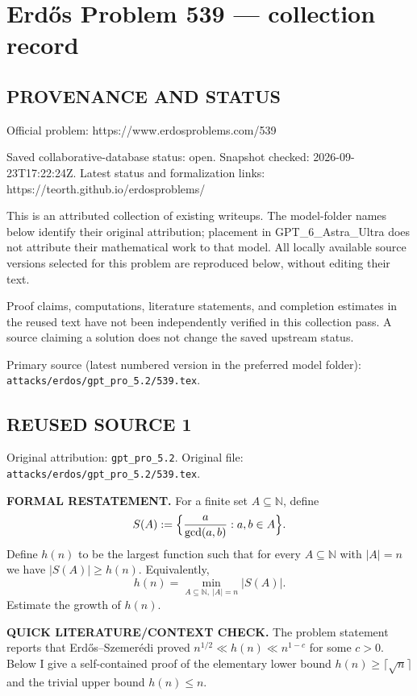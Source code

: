 \section*{Erd\H{o}s Problem 539 --- collection record}

\subsection*{PROVENANCE AND STATUS}
Official problem: https://www.erdosproblems.com/539

Saved collaborative-database status: open.
Snapshot checked: 2026-09-23T17:22:24Z.
Latest status and formalization links: https://teorth.github.io/erdosproblems/

This is an attributed collection of existing writeups. The model-folder names below identify their original attribution; placement in GPT\_6\_Astra\_Ultra does not attribute their mathematical work to that model. All locally available source versions selected for this problem are reproduced below, without editing their text.

Proof claims, computations, literature statements, and completion estimates in the reused text have not been independently verified in this collection pass. A source claiming a solution does not change the saved upstream status.

Primary source (latest numbered version in the preferred model folder): \texttt{attacks/erdos/gpt\_pro\_5.2/539.tex}.

\subsection*{REUSED SOURCE 1}
Original attribution: \texttt{gpt\_pro\_5.2}.
Original file: \texttt{attacks/erdos/gpt\_pro\_5.2/539.tex}.


\noindent\textbf{FORMAL RESTATEMENT.}
For a finite set $A\subseteq\mathbb N$, define
\[
S(A):=\Bigl\{\frac{a}{\gcd(a,b)}: a,b\in A\Bigr\}.
\]
Define $h(n)$ to be the largest function such that for every $A\subseteq\mathbb N$ with $|A|=n$ we have $|S(A)|\ge h(n)$.
Equivalently,
\[
 h(n)=\min_{A\subseteq\mathbb N,\ |A|=n} |S(A)|.
\]
Estimate the growth of $h(n)$.

\noindent\textbf{QUICK LITERATURE/CONTEXT CHECK.}
The problem statement reports that Erd\H{o}s--Szemer\'edi proved
$n^{1/2}\ll h(n)\ll n^{1-c}$ for some $c>0$.
Below I give a self-contained proof of the elementary lower bound $h(n)\ge \lceil\sqrt n\rceil$ and the trivial upper bound $h(n)\le n$.

